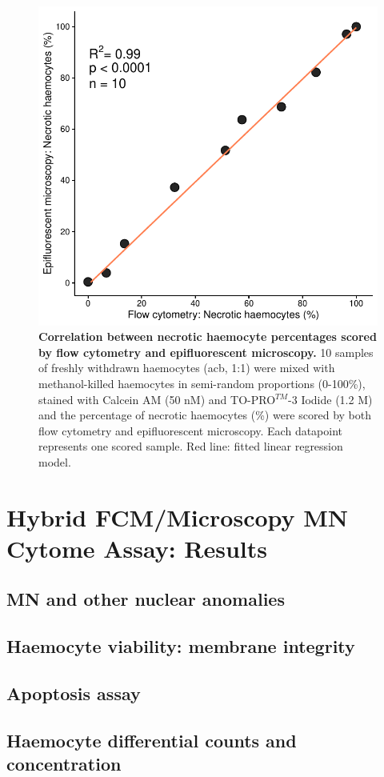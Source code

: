 \begin{figure}[h]
    \centering
    \includegraphics[width=.65\textwidth]{figures/Method development/FCM FM lin reg.pdf}
    \caption{\textbf{Correlation between necrotic haemocyte percentages scored by flow cytometry and epifluorescent microscopy.} 10 samples of freshly withdrawn haemocytes (\acrshort{acb}, 1:1) were mixed with methanol-killed haemocytes in semi-random proportions (0-100\%), stained with Calcein AM (50 nM) and TO-PRO$^{TM}$-3 Iodide (1.2 \micro M) and the percentage of necrotic haemocytes (\%) were scored by both flow cytometry and epifluorescent microscopy. Each datapoint represents one scored sample. Red line: fitted linear regression model.}
    \label{fig:method_val_1}
\end{figure}



\newpage
\section{Hybrid FCM/Microscopy MN Cytome Assay: Results}
\subsection{MN and other nuclear anomalies}
\subsection{Haemocyte viability: membrane integrity}
\subsection{Apoptosis assay}
\subsection{Haemocyte differential counts and concentration}

